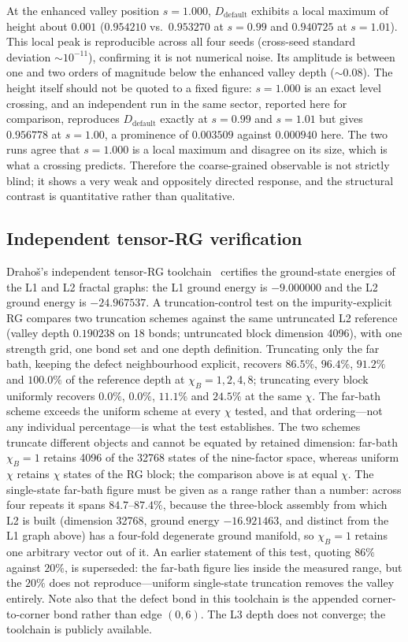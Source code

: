 \documentclass[pdflatex,sn-mathphys-num,iicol]{sn-jnl}
\begin{document}
At the enhanced valley position $s=1.000$, $D_{\text{default}}$ exhibits a local maximum of height about $0.001$ ($0.954210$ vs.\ $0.953270$ at $s=0.99$ and $0.940725$ at $s=1.01$). This local peak is reproducible across all four seeds (cross-seed standard deviation $\sim10^{-11}$), confirming it is not numerical noise. Its amplitude is between one and two orders of magnitude below the enhanced valley depth ($\sim0.08$). The height itself should not be quoted to a fixed figure: $s=1.000$ is an exact level crossing, and an independent run in the same sector, reported here for comparison, reproduces $D_{\text{default}}$ exactly at $s=0.99$ and $s=1.01$ but gives $0.956778$ at $s=1.00$, a prominence of $0.003509$ against $0.000940$ here. The two runs agree that $s=1.000$ is a local maximum and disagree on its size, which is what a crossing predicts. Therefore the coarse-grained observable is not strictly blind; it shows a very weak and oppositely directed response, and the structural contrast is quantitative rather than qualitative.

\subsection{Independent tensor-RG verification}

Draho\v{s}'s independent tensor-RG toolchain~\cite{Drahos2026GitHub} certifies the ground-state energies of the L1 and L2 fractal graphs: the L1 ground energy is $-9.000000$ and the L2 ground energy is $-24.967537$. A truncation-control test on the impurity-explicit RG compares two truncation schemes against the same untruncated L2 reference (valley depth $0.190238$ on 18 bonds; untruncated block dimension 4096), with one strength grid, one bond set and one depth definition. Truncating only the far bath, keeping the defect neighbourhood explicit, recovers $86.5\%$, $96.4\%$, $91.2\%$ and $100.0\%$ of the reference depth at $\chi_B=1,2,4,8$; truncating every block uniformly recovers $0.0\%$, $0.0\%$, $11.1\%$ and $24.5\%$ at the same $\chi$. The far-bath scheme exceeds the uniform scheme at every $\chi$ tested, and that ordering---not any individual percentage---is what the test establishes. The two schemes truncate different objects and cannot be equated by retained dimension: far-bath $\chi_B=1$ retains 4096 of the 32768 states of the nine-factor space, whereas uniform $\chi$ retains $\chi$ states of the RG block; the comparison above is at equal $\chi$. The single-state far-bath figure must be given as a range rather than a number: across four repeats it spans $84.7$--$87.4\%$, because the three-block assembly from which L2 is built (dimension 32768, ground energy $-16.921463$, and distinct from the L1 graph above) has a four-fold degenerate ground manifold, so $\chi_B=1$ retains one arbitrary vector out of it. An earlier statement of this test, quoting $86\%$ against $20\%$, is superseded: the far-bath figure lies inside the measured range, but the $20\%$ does not reproduce---uniform single-state truncation removes the valley entirely. Note also that the defect bond in this toolchain is the appended corner-to-corner bond rather than edge $(0,6)$. The L3 depth does not converge; the toolchain is publicly available.
\end{document}
